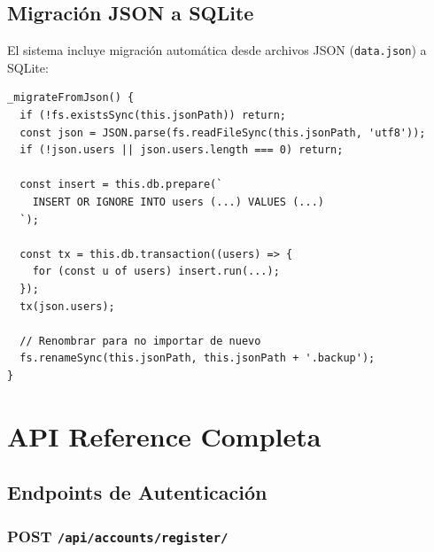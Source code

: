 \documentclass[12pt,a4paper,openany]{article}
\begin{document}
\subsection{Migración JSON a SQLite}

El sistema incluye migración automática desde archivos JSON (\texttt{data.json}) a SQLite:

\begin{lstlisting}[style=jsstyle, caption={Lógica de migración}]
_migrateFromJson() {
  if (!fs.existsSync(this.jsonPath)) return;
  const json = JSON.parse(fs.readFileSync(this.jsonPath, 'utf8'));
  if (!json.users || json.users.length === 0) return;
  
  const insert = this.db.prepare(`
    INSERT OR IGNORE INTO users (...) VALUES (...)
  `);
  
  const tx = this.db.transaction((users) => {
    for (const u of users) insert.run(...);
  });
  tx(json.users);
  
  // Renombrar para no importar de nuevo
  fs.renameSync(this.jsonPath, this.jsonPath + '.backup');
}
\end{lstlisting}

\section{API Reference Completa}

\subsection{Endpoints de Autenticación}

\subsubsection{POST \texttt{/api/accounts/register/}}
\end{document}
